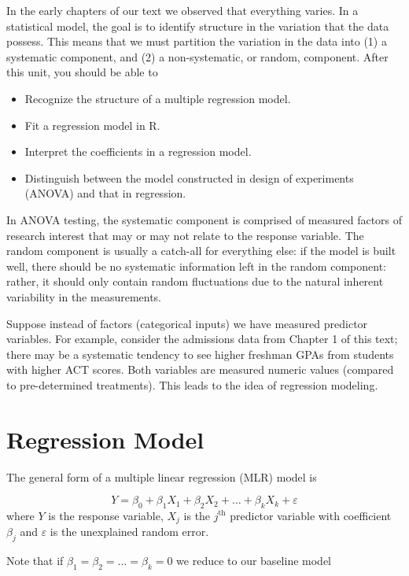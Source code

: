 \documentclass[
]{book}
\providecommand{\tightlist}{%
  \setlength{\itemsep}{0pt}\setlength{\parskip}{0pt}}
\begin{document}
In the early chapters of our text we observed that everything varies.
In a statistical model, the goal is to identify structure in the variation that the data possess.
This means that we must partition the variation in the data into (1) a systematic component, and (2) a non-systematic, or random, component.
After this unit, you should be able to

\begin{itemize}
\tightlist
\item
  Recognize the structure of a multiple regression model.
\item
  Fit a regression model in R.
\item
  Interpret the coefficients in a regression model.
\item
  Distinguish between the model constructed in design of experiments (ANOVA) and that in regression.
\end{itemize}

In ANOVA testing, the systematic component is comprised of measured factors of research interest that may or may not relate to the response variable.
The random component is usually a catch-all for everything else: if the model is built well, there should be no systematic information left in the random component: rather, it should only contain random fluctuations due to the natural inherent variability in the measurements.

Suppose instead of factors (categorical inputs) we have measured predictor variables.
For example, consider the admissions data from Chapter 1 of this text; there may be a systematic tendency to see higher freshman GPAs from students with higher ACT scores.
Both variables are measured numeric values (compared to pre-determined treatments).
This leads to the idea of regression modeling.

\hypertarget{regression-model}{%
\section{Regression Model}\label{regression-model}}

The general form of a multiple linear regression (MLR) model is

\[Y = \beta_0 + \beta_1 X_1 + \beta_2 X_2 + \ldots + \beta_k X_k + \varepsilon\]
where \(Y\) is the response variable, \(X_j\) is the \(j^\mathrm{th}\) predictor variable with coefficient \(\beta_j\) and \(\varepsilon\) is the unexplained random error.

Note that if \(\beta_1=\beta_2=\ldots=\beta_k=0\) we reduce to our baseline model
\end{document}
